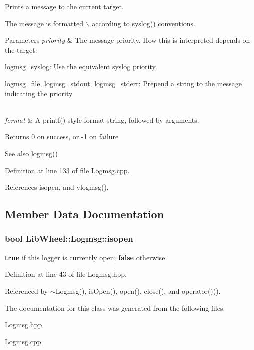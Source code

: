 \-Prints a message to the current target. 

\-The message is formatted $\backslash$ according to syslog() conventions. 
\begin{DoxyParams}{\-Parameters}
{\em priority} & \-The message priority. \-How this is interpreted depends on the target\-:
\begin{DoxyItemize}
\item {\ttfamily logmsg\-\_\-syslog\-:} \-Use the equivalent syslog priority.
\item {\ttfamily logmsg\-\_\-file}, {\ttfamily logmsg\-\_\-stdout}, {\ttfamily logmsg\-\_\-stderr\-:} \-Prepend a string to the message indicating the priority 
\end{DoxyItemize}\\
\hline
{\em format} & \-A printf()-\/style format string, followed by arguments. \\
\hline
\end{DoxyParams}
\begin{DoxyReturn}{\-Returns}
0 on success, or -\/1 on failure 
\end{DoxyReturn}
\begin{DoxySeeAlso}{\-See also}
\hyperlink{namespaceLibWheel_af4ca70f4f65b2948701218436516a679}{logmsg()} 
\end{DoxySeeAlso}


\-Definition at line 133 of file \-Logmsg.\-cpp.



\-References isopen, and vlogmsg().



\subsection{\-Member \-Data \-Documentation}
\hypertarget{classLibWheel_1_1Logmsg_ab5647829f4a986be079f9a10e87d5dfb}{
\subsubsection[{isopen}]{\setlength{\rightskip}{0pt plus 5cm}bool {\bf \-Lib\-Wheel\-::\-Logmsg\-::isopen}}}
\label{classLibWheel_1_1Logmsg_ab5647829f4a986be079f9a10e87d5dfb}


{\bfseries true} if this logger is currently open; {\bfseries false} otherwise 



\-Definition at line 43 of file \-Logmsg.\-hpp.



\-Referenced by $\sim$\-Logmsg(), is\-Open(), open(), close(), and operator()().



\-The documentation for this class was generated from the following files\-:\begin{DoxyCompactItemize}
\item 
\hyperlink{Logmsg_8hpp}{\-Logmsg.\-hpp}\item 
\hyperlink{Logmsg_8cpp}{\-Logmsg.\-cpp}\end{DoxyCompactItemize}
